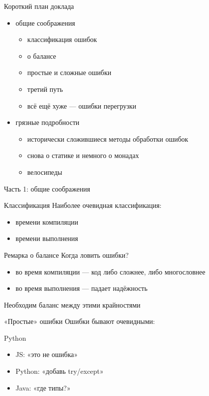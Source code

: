 \documentclass[10pt]{beamer}
\begin{document}
\begin{frame}{Короткий план доклада}
  \begin{itemize}
  \item общие соображения
    \begin{itemize}
    \item классификация ошибок
    \item о балансе
    \item простые и сложные ошибки
    \item третий путь
    \item всё ещё хуже — ошибки перегрузки
    \end{itemize}
  \item грязные подробности
    \begin{itemize}
    \item исторически сложившиеся методы обработки ошибок
    \item снова о статике и немного о монадах
    \item велосипеды
    \end{itemize}
  \end{itemize}
\end{frame}

\begin{frame}{}
  \begin{center}
    \huge Часть 1: общие соображения
  \end{center}
\end{frame}

\begin{frame}{Классификация}
  Наиболее очевидная классификация:
  \begin{itemize}
  \item времени компиляции
  \item времени выполнения
  \end{itemize}
\end{frame}

\begin{frame}{Ремарка о балансе}
  Когда ловить ошибки?
  \begin{itemize}
  \item во время компиляции — код либо сложнее, либо многословнее
  \item во время выполнения — падает надёжность
  \end{itemize}
  Необходим баланс между этими крайностями
\end{frame}

\begin{frame}{«Простые» ошибки}
  Ошибки бывают очевидными:
  \begin{block}{Python}
    \centering
    \small
    \lstset{language=python}
    
  \end{block}
  \begin{itemize}
  \item JS: «это не ошибка»
  \item Python: «добавь try/except»
  \item Java: «где типы?»
  \end{itemize}
\end{frame}
\end{document}
